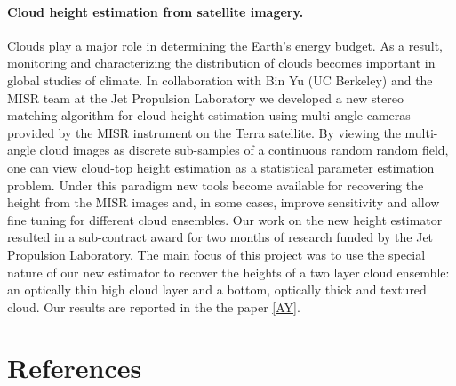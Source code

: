 \documentclass[12pt]{article}
\begin{document}
\paragraph{Cloud height estimation from satellite imagery.}
Clouds play a major role in determining the Earth's energy budget. As a result,  monitoring and characterizing the distribution of clouds becomes  important  in global studies of climate. In collaboration with Bin Yu (UC Berkeley) and the MISR team at the Jet Propulsion Laboratory we developed a new stereo matching algorithm for cloud height estimation using multi-angle cameras provided by the MISR instrument on the Terra satellite. By viewing the multi-angle cloud images as discrete sub-samples of a continuous random random field, one can view  cloud-top height estimation as a statistical parameter estimation problem.
Under this paradigm new tools become available for recovering the height from the MISR images and, in some cases,  improve sensitivity and allow fine tuning for different cloud ensembles.
Our work on the new height estimator resulted in a sub-contract  award for two months of research funded by the Jet Propulsion Laboratory. The main focus of this project was to use the special nature of our new estimator to recover the heights of a two layer cloud ensemble: an optically thin high cloud layer and a bottom, optically thick and textured cloud. Our results are reported in the the paper \ref{AY}.



\section*{References}
\end{document}
